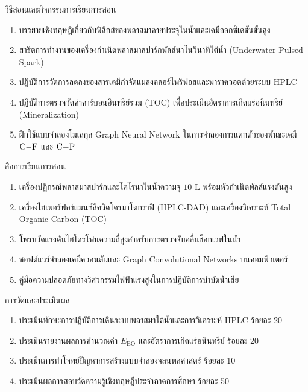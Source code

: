 \newpage

\begin{planbox}{วิธีสอนและกิจกรรมการเรียนการสอน}
\begin{enumerate}
    \item บรรยายเชิงทฤษฎีเกี่ยวกับฟิสิกส์ของพลาสมาคายประจุในน้ำและเคมีออกซิเดชันขั้นสูง
    \item สาธิตการทำงานของเครื่องกำเนิดพลาสมาสปาร์กพัลส์นาโนวินาทีใต้น้ำ (Underwater Pulsed Spark)
    \item ปฏิบัติการวัดการลดลงของสารเคมีกำจัดแมลงคลอร์ไพริฟอสและพาราควอตด้วยระบบ HPLC
    \item ปฏิบัติการตรวจวัดค่าคาร์บอนอินทรีย์รวม (TOC) เพื่อประเมินอัตราการเกิดแร่อนินทรีย์ (Mineralization)
    \item ฝึกใช้แบบจำลองโมเลกุล Graph Neural Network ในการจำลองการแตกตัวของพันธะเคมี $\ce{C-F}$ และ $\ce{C-P}$
\end{enumerate}
\end{planbox}

\begin{planbox}{สื่อการเรียนการสอน}
\begin{enumerate}
    \item เครื่องปฏิกรณ์พลาสมาสปาร์กและโคโรนาในน้ำความจุ $10 \text{ L}$ พร้อมหัวกำเนิดพัลส์แรงดันสูง
    \item เครื่องไฮเพอร์ฟอร์แมนซ์ลิควิดโครมาโตกราฟี (HPLC-DAD) และเครื่องวิเคราะห์ Total Organic Carbon (TOC)
    \item โพรบวัดแรงดันไฮโดรโฟนความถี่สูงสำหรับการตรวจจับคลื่นช็อกเวฟในน้ำ
    \item ซอฟต์แวร์จำลองเคมีควอนตัมและ Graph Convolutional Networks บนคอมพิวเตอร์
    \item คู่มือความปลอดภัยทางวิศวกรรมไฟฟ้าแรงสูงในการปฏิบัติการบำบัดน้ำเสีย
\end{enumerate}
\end{planbox}

\begin{planbox}{การวัดและประเมินผล}
\begin{enumerate}
    \item ประเมินทักษะการปฏิบัติการเดินระบบพลาสมาใต้น้ำและการวิเคราะห์ HPLC ร้อยละ 20
    \item ประเมินรายงานผลการคำนวณค่า $E_{\text{EO}}$ และอัตราการเกิดแร่อนินทรีย์ ร้อยละ 20
    \item ประเมินการทำโจทย์ปัญหาการสร้างแบบจำลองจลนพลศาสตร์ ร้อยละ 10
    \item ประเมินผลการสอบวัดความรู้เชิงทฤษฎีประจำภาคการศึกษา ร้อยละ 50
\end{enumerate}
\end{planbox}

